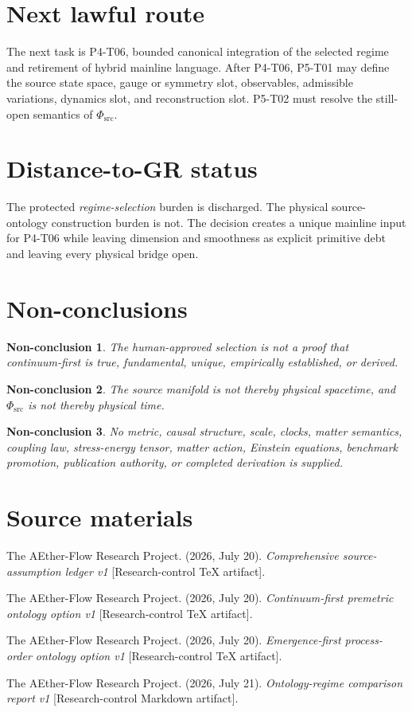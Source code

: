 \documentclass[11pt]{article}
\newcommand{\PhiSrc}{\Phi_{\mathrm{src}}}
\newtheorem{nonconclusion}{Non-conclusion}
\begin{document}
\section{Next lawful route}

The next task is P4-T06, bounded canonical integration of the selected regime
and retirement of hybrid mainline language.  After P4-T06, P5-T01 may define
the source state space, gauge or symmetry slot, observables, admissible
variations, dynamics slot, and reconstruction slot.  P5-T02 must resolve the
still-open semantics of \(\PhiSrc\).

\section{Distance-to-GR status}

The protected \emph{regime-selection} burden is discharged.  The physical
source-ontology construction burden is not.  The decision creates a unique
mainline input for P4-T06 while leaving dimension and smoothness as explicit
primitive debt and leaving every physical bridge open.

\section{Non-conclusions}

\begin{nonconclusion}
The human-approved selection is not a proof that continuum-first is true,
fundamental, unique, empirically established, or derived.
\end{nonconclusion}

\begin{nonconclusion}
The source manifold is not thereby physical spacetime, and \(\PhiSrc\) is not
thereby physical time.
\end{nonconclusion}

\begin{nonconclusion}
No metric, causal structure, scale, clocks, matter semantics, coupling law,
stress-energy tensor, matter action, Einstein equations, benchmark promotion,
publication authority, or completed derivation is supplied.
\end{nonconclusion}

\section{Source materials}

The AEther-Flow Research Project. (2026, July 20). \textit{Comprehensive
source-assumption ledger v1} [Research-control TeX artifact].

The AEther-Flow Research Project. (2026, July 20). \textit{Continuum-first
premetric ontology option v1} [Research-control TeX artifact].

The AEther-Flow Research Project. (2026, July 20). \textit{Emergence-first
process-order ontology option v1} [Research-control TeX artifact].

The AEther-Flow Research Project. (2026, July 21). \textit{Ontology-regime
comparison report v1} [Research-control Markdown artifact].
\end{document}

